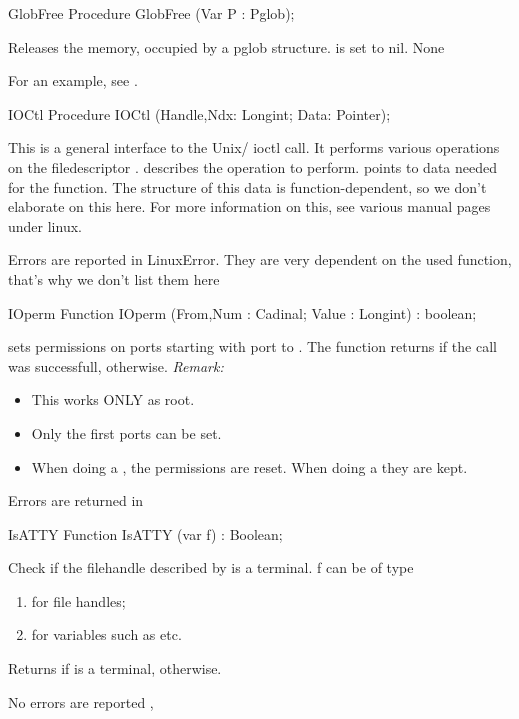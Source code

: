 \html{}
\begin{procedure}{GlobFree}
\Declaration
Procedure GlobFree (Var P : Pglob);

\Description
Releases the memory, occupied by a pglob structure.  is set to nil.
\Errors
None
\SeeAlso
\end{procedure}
For an example, see .
\begin{procedure}{IOCtl}
\Declaration
Procedure IOCtl (Handle,Ndx: Longint; Data: Pointer);

\Description

This is a general interface to the Unix/ \linux ioctl call.
It performs various operations on the filedescriptor .
 describes the operation to perform.
 points to data needed for the  function. 
The structure of this data is function-dependent, so we don't elaborate on
this here. 
For more information on this, see various manual pages under linux.

\Errors

Errors are reported in LinuxError. They are very dependent on the used
function, that's why we don't list them here

\SeeAlso
{}
\end{procedure}
\html{}
\begin{function}{IOperm}
\Declaration
Function IOperm (From,Num : Cadinal; Value : Longint) : boolean;

\Description
{}
  sets permissions on  ports starting with port  to 
  . The function returns  if the call was successfull,
   otherwise.
{\em Remark:}
\begin{itemize}
\item This works ONLY as root.
\item Only the first  ports can be set.
\item When doing a , the permissions are reset. When doing a
 they are kept.
\end{itemize}

\Errors
Errors are returned in 
\SeeAlso
{}
\end{function}
\begin{function}{IsATTY}
\Declaration
Function IsATTY (var f) : Boolean;

\Description

Check if the filehandle described by  is a terminal.
f can be of type
\begin{enumerate}
\item {} for file handles;
\item {} for  variables such as  etc.
\end{enumerate}
Returns  if  is a terminal,  otherwise.

\Errors
No errors are reported
\SeeAlso
{},
\end{function}
